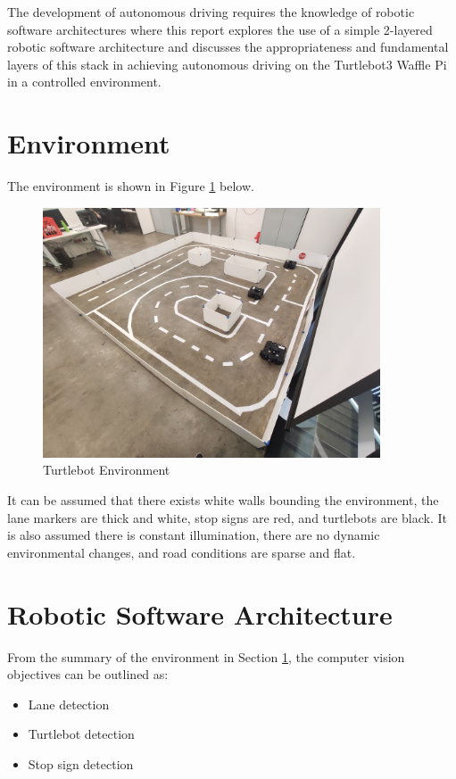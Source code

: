 \documentclass[11pt]{article}
\begin{document}
    The development of autonomous driving requires the knowledge of robotic software architectures where this report explores the use of a simple 2-layered robotic software architecture and discusses the appropriateness and fundamental layers of this stack in achieving autonomous driving on the Turtlebot3 Waffle Pi in a controlled environment.

\section{Environment}
\label{sec:environment}

    The environment is shown in Figure \ref{fig:environment} below.

    \begin{figure}[h!]
        \centering
        \includegraphics[width=100mm]{images/environment.jpg}
        \caption{Turtlebot Environment}
        \label{fig:environment}
    \end{figure}

    It can be assumed that there exists white walls bounding the environment, the lane markers are thick and white, stop signs are red, and turtlebots are black. It is also assumed there is constant illumination, there are no dynamic environmental changes, and road conditions are sparse and flat.

\section{Robotic Software Architecture}
\label{sec:stack}

    From the summary of the environment in Section \ref{sec:environment}, the computer vision objectives can be outlined as:
    \begin{itemize}[noitemsep, nolistsep]
        \item Lane detection
        \item Turtlebot detection
        \item Stop sign detection
    \end{itemize}
\end{document}
